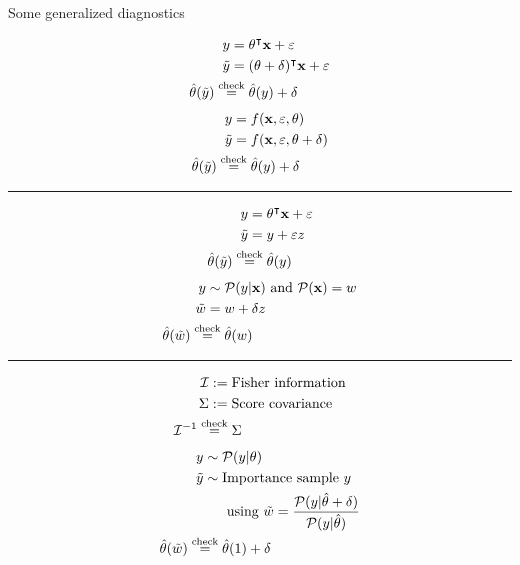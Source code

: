 \def\methodspacer{
    \vspace{1em}
    \hrule
    \vspace{1em}
}

\begin{frame}{Some generalized diagnostics}

\vspace{2em}

{
$$
\begin{aligned}
    y ={}& \theta^\intercal \mathbf{x} + \varepsilon \\
    \tilde{y} ={}& (\theta + \delta)^\intercal \mathbf{x} + \varepsilon \\
    \hat{\theta}(\tilde{y}) \overset{\textrm{check}}{=}{}& \hat{\theta}(y) + \delta
\end{aligned}
$$
}{
$$
\begin{aligned}
    y ={}& f(\mathbf{x}, \varepsilon, \theta) \\
    \tilde{y} ={}& f(\mathbf{x}, \varepsilon, \theta + \delta) \\
    \hat{\theta}(\tilde{y}) \overset{\textrm{check}}{=}{}& \hat{\theta}(y) + \delta
\end{aligned}
$$
}

\methodspacer

{
$$
\begin{aligned}
    y ={}& \theta^\intercal \mathbf{x} + \varepsilon \\
    \tilde{y} ={}& y + \varepsilon z \\
    \hat{\theta}(\tilde{y}) \overset{\textrm{check}}{=}{}& \hat{\theta}(y)
\end{aligned}
$$
}{
$$
\begin{aligned}
    y \sim{}& \mathcal{P}(y \vert \mathbf{x}) \textrm{ and } \mathcal{P}(\mathbf{x}) ={} w \\
    \tilde{w} ={}& w + \delta z \\
    \hat{\theta}(\tilde{w}) \overset{\textrm{check}}{=}{}& \hat{\theta}(w)
\end{aligned}
$$
}


\methodspacer


{
$$
\begin{aligned}
    \mathcal{I} :={}& \textrm{Fisher information}\\
    \Sigma :={}& \textrm{Score covariance} \\
    \mathcal{I}^{-1} \overset{\textrm{check}}{=}{}& \Sigma
\end{aligned}
$$
}{
$$
\begin{aligned}
    y \sim{}& \mathcal{P}(y \vert \theta) \\
    \tilde{y} \sim{}& \textrm{Importance sample }y\\
    &\textrm{ using }\tilde{w} ={} \frac{\mathcal{P}(y \vert \hat{\theta} + \delta)}{\mathcal{P}(y \vert \hat{\theta})} \\
    \hat{\theta}(\tilde{w}) \overset{\textrm{check}}{=}{}& \hat{\theta}(1) + \delta
\end{aligned}
$$
}


\vspace{2em}


\end{frame}



